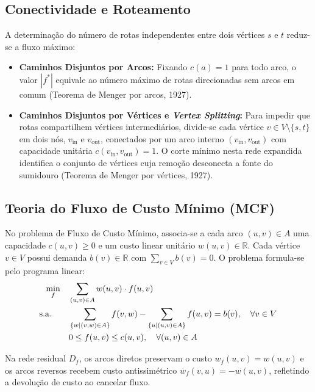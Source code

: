 \subsection{Conectividade e Roteamento}

A determinação do número de rotas independentes entre dois vértices $s$ e $t$ reduz-se a fluxo máximo:
\begin{itemize}[leftmargin=1.5em, itemsep=0.15em, topsep=0.2em, parsep=0em]
    \item \textbf{Caminhos Disjuntos por Arcos:} Fixando $c(a) = 1$ para todo arco, o valor $|f^*|$ equivale ao número máximo de rotas direcionadas sem arcos em comum (Teorema de Menger por arcos, 1927).
    \item \textbf{Caminhos Disjuntos por Vértices e \textit{Vertex Splitting}:} Para impedir que rotas compartilhem vértices intermediários, divide-se cada vértice $v \in V \setminus \{s, t\}$ em dois nós, $v_{\text{in}}$ e $v_{\text{out}}$, conectados por um arco interno $(v_{\text{in}}, v_{\text{out}})$ com capacidade unitária $c(v_{\text{in}}, v_{\text{out}}) = 1$. O corte mínimo nesta rede expandida identifica o conjunto de vértices cuja remoção desconecta a fonte do sumidouro (Teorema de Menger por vértices, 1927).
\end{itemize}

\subsection{Teoria do Fluxo de Custo Mínimo (MCF)}

No problema de Fluxo de Custo Mínimo, associa-se a cada arco $(u, v) \in A$ uma capacidade $c(u, v) \ge 0$ e um custo linear unitário $w(u, v) \in \mathbb{R}$. Cada vértice $v \in V$ possui demanda $b(v) \in \mathbb{R}$ com $\sum_{v \in V} b(v) = 0$. O problema formula-se pelo programa linear:
\begin{align}
    \min_{f} \quad & \sum_{(u, v) \in A} w(u, v) \cdot f(u, v) \\
    \text{s.a.}\quad \quad & \sum_{\{w \mid (v, w) \in A\}} f(v, w) - \sum_{\{u \mid (u, v) \in A\}} f(u, v) = b(v), \quad \forall v \in V \\
    & 0 \le f(u, v) \le c(u, v), \quad \forall (u, v) \in A
\end{align}

Na rede residual $D_f$, os arcos diretos preservam o custo $w_f(u, v) = w(u, v)$ e os arcos reversos recebem custo antissimétrico $w_f(v, u) = -w(u, v)$, refletindo a devolução de custo ao cancelar fluxo.


